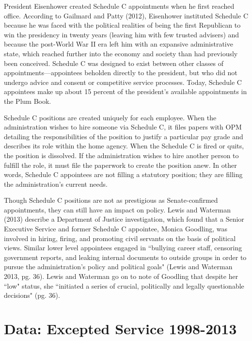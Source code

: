 \documentclass[12pt]{article}
\begin{document}
	President Eisenhower created Schedule C appointments when he first reached office. According to Gailmard and Patty (2012), Eisenhower instituted Schedule C because he was faced with the political realities of being the first Republican to win the presidency in twenty years (leaving him with few trusted advisers) and because the post-World War II era left him with an expansive administrative state, which reached further into the economy and society than had previously been conceived. Schedule C was designed to exist between other classes of appointments---appointees beholden directly to the president, but who did not undergo advice and consent or competitive service processes. Today, Schedule C appointees make up about 15 percent of the president's available appointments in the Plum Book.
	
	Schedule C positions are created uniquely for each employee. When the administration wishes to hire someone via Schedule C, it files papers with OPM detailing the responsibilities of the position to justify a particular pay grade and describes its role within the home agency. When the Schedule C is fired or quits, the position is dissolved. If the administration wishes to hire another person to fulfill the role, it must file the paperwork to create the position anew. In other words, Schedule C appointees are not filling a statutory position; they are filling the administration's current needs.	
	
	Though Schedule C positions are not as prestigious as Senate-confirmed appointments, they can still have an impact on policy. Lewis and Waterman (2013) describe a Department of Justice investigation, which found that a Senior Executive Service and former Schedule C appointee, Monica Goodling, was involved in hiring, firing, and promoting civil servants on the basis of political views. Similar lower level appointees engaged in ``bullying career staff, censoring government reports, and leaking internal documents to outside groups in order to pursue the administration's policy and political goals" (Lewis and Waterman 2013, pg. 36). Lewis and Waterman go on to note of Goodling that despite her ``low" status, she ``initiated a series of crucial, politically and legally questionable decisions" (pg. 36). 
	
\section*{Data: Excepted Service 1998-2013}
\end{document}
